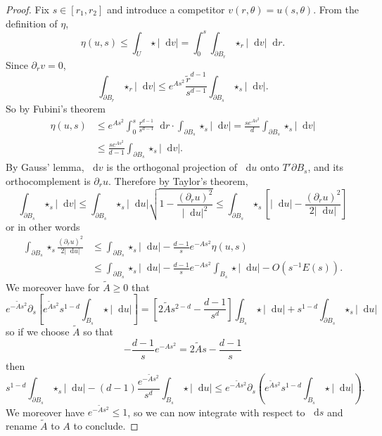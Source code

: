 \documentclass[reqno,11pt]{amsart}
\newcommand*\dif{\mathop{}\!\mathrm{d}}
\theoremstyle{definition}
\numberwithin{equation}{section}
\begin{document}
\begin{proof}
Fix $s \in [r_1, r_2]$ and introduce a competitor $v(r, \theta) = u(s, \theta)$.
From the definition of $\eta$,
$$\eta(u, s) \leq \int_U \star |\dif v| = \int_0^s \int_{\partial B_r} \star_r |\dif v| \dif r.$$
Since $\partial_r v = 0$,
$$\int_{\partial B_r} \star_r |\dif v| \leq e^{As^2} \frac{\tilde r^{d - 1}}{s^{d - 1}} \int_{\partial B_s} \star_s |\dif v|.$$
So by Fubini's theorem
\begin{align*}
\eta(u, s) &\leq e^{As^2} \int_0^s \frac{r^{d - 1}}{s^{d - 1}} \dif r \cdot \int_{\partial B_s} \star_s |\dif v| = \frac{s e^{As^2}}{d} \int_{\partial B_s} \star_s |\dif v|\\
&\leq \frac{s e^{As^2}}{d - 1} \int_{\partial B_s} \star_s |\dif v|.
\end{align*}
By Gauss' lemma, $\dif v$ is the orthogonal projection of $\dif u$ onto $T' \partial B_s$, and its orthocomplement is $\partial_r u$. Therefore by Taylor's theorem,
$$\int_{\partial B_s} \star_s |\dif v| \leq \int_{\partial B_s} \star_s |\dif u| \sqrt{1 - \frac{(\partial_r u)^2}{|\dif u|^2}} \leq \int_{\partial B_s} \star_s \left[|\dif u| - \frac{(\partial_r u)^2}{2 |\dif u|}\right]$$
or in other words
\begin{align*}
\int_{\partial B_s} \star_s \frac{(\partial_r u)^2}{2|\dif u|} &\leq \int_{\partial B_s} \star_s |\dif u| - \frac{d - 1}{s} e^{-As^2} \eta(u, s)\\
&\leq \int_{\partial B_s} \star_s |\dif u| - \frac{d - 1}{s} e^{-As^2} \int_{B_s} \star |\dif u| - O(s^{-1}E(s)).
\end{align*}
We moreover have for $\tilde A \geq 0$ that
$$e^{-\tilde As^2} \partial_s \left[e^{\tilde As^2} s^{1 - d} \int_{B_s} \star |\dif u|\right] = \left[2\tilde As^{2 - d} - \frac{d - 1}{s^d}\right]\int_{B_s} \star |\dif u| + s^{1 - d} \int_{\partial B_s} \star_s |\dif u|$$
so if we choose $\tilde A$ so that
$$-\frac{d - 1}{s} e^{-As^2} = 2\tilde As - \frac{d - 1}{s}$$
then
$$s^{1 - d} \int_{\partial B_s} \star_s |\dif u| - (d - 1)\frac{e^{-\tilde As^2}}{s^d} \int_{B_s} \star|\dif u| \leq e^{-\tilde As^2} \partial_s\left(e^{\tilde As^2} s^{1 - d} \int_{B_s} \star|\dif u|\right).$$
We moreover have $e^{-\tilde As^2} \leq 1$, so we can now integrate with respect to $\dif s$ and rename $\tilde A$ to $A$ to conclude.
\end{proof}
\end{document}
